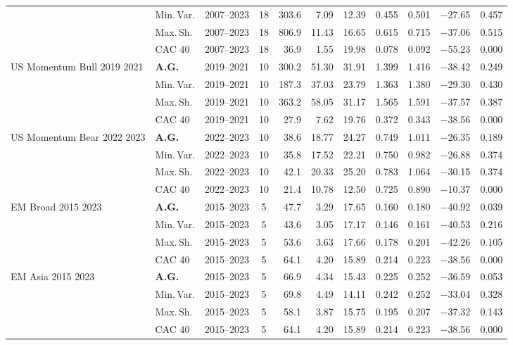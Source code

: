 \begin{longtable}{p{2.6cm} l c c r r r r r r r}
 & Min.\,Var. & 2007--2023 & 18 & 303.6 & 7.09 & 12.39 & 0.455 & 0.501 & $-$27.65 & 0.457 \\
 & Max.\,Sh. & 2007--2023 & 18 & 806.9 & 11.43 & 16.65 & 0.615 & 0.715 & $-$37.06 & 0.515 \\
 & CAC 40 & 2007--2023 & 18 & 36.9 & 1.55 & 19.98 & 0.078 & 0.092 & $-$55.23 & 0.000 \\
\midrule
US Momentum Bull 2019 2021 & \textbf{A.G.} & 2019--2021 & 10 & 300.2 & 51.30 & 31.91 & 1.399 & 1.416 & $-$38.42 & 0.249 \\
 & Min.\,Var. & 2019--2021 & 10 & 187.3 & 37.03 & 23.79 & 1.363 & 1.380 & $-$29.30 & 0.430 \\
 & Max.\,Sh. & 2019--2021 & 10 & 363.2 & 58.05 & 31.17 & 1.565 & 1.591 & $-$37.57 & 0.387 \\
 & CAC 40 & 2019--2021 & 10 & 27.9 & 7.62 & 19.76 & 0.372 & 0.343 & $-$38.56 & 0.000 \\
\midrule
US Momentum Bear 2022 2023 & \textbf{A.G.} & 2022--2023 & 10 & 38.6 & 18.77 & 24.27 & 0.749 & 1.011 & $-$26.35 & 0.189 \\
 & Min.\,Var. & 2022--2023 & 10 & 35.8 & 17.52 & 22.21 & 0.750 & 0.982 & $-$26.88 & 0.374 \\
 & Max.\,Sh. & 2022--2023 & 10 & 42.1 & 20.33 & 25.20 & 0.783 & 1.064 & $-$30.15 & 0.374 \\
 & CAC 40 & 2022--2023 & 10 & 21.4 & 10.78 & 12.50 & 0.725 & 0.890 & $-$10.37 & 0.000 \\
\midrule
EM Broad 2015 2023 & \textbf{A.G.} & 2015--2023 & 5 & 47.7 & 3.29 & 17.65 & 0.160 & 0.180 & $-$40.92 & 0.039 \\
 & Min.\,Var. & 2015--2023 & 5 & 43.6 & 3.05 & 17.17 & 0.146 & 0.161 & $-$40.53 & 0.216 \\
 & Max.\,Sh. & 2015--2023 & 5 & 53.6 & 3.63 & 17.66 & 0.178 & 0.201 & $-$42.26 & 0.105 \\
 & CAC 40 & 2015--2023 & 5 & 64.1 & 4.20 & 15.89 & 0.214 & 0.223 & $-$38.56 & 0.000 \\
\midrule
EM Asia 2015 2023 & \textbf{A.G.} & 2015--2023 & 5 & 66.9 & 4.34 & 15.43 & 0.225 & 0.252 & $-$36.59 & 0.053 \\
 & Min.\,Var. & 2015--2023 & 5 & 69.8 & 4.49 & 14.11 & 0.242 & 0.252 & $-$33.04 & 0.328 \\
 & Max.\,Sh. & 2015--2023 & 5 & 58.1 & 3.87 & 15.75 & 0.195 & 0.207 & $-$37.32 & 0.143 \\
 & CAC 40 & 2015--2023 & 5 & 64.1 & 4.20 & 15.89 & 0.214 & 0.223 & $-$38.56 & 0.000 \\

\end{longtable}
